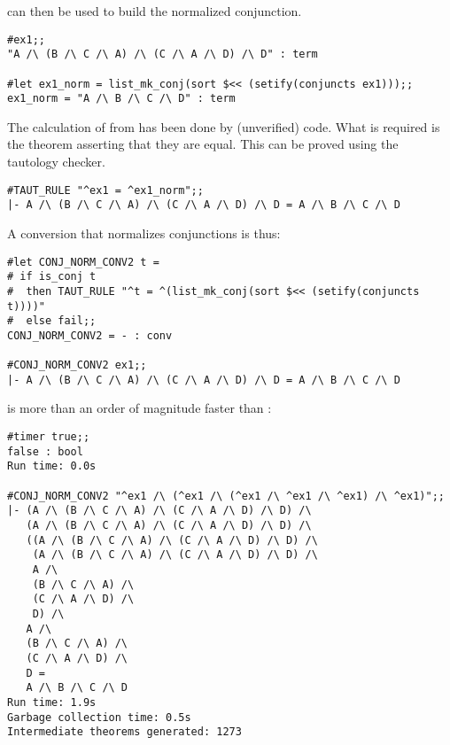 \noindent can then be used to build the normalized conjunction.


\begin{session}\begin{verbatim}
#ex1;;
"A /\ (B /\ C /\ A) /\ (C /\ A /\ D) /\ D" : term

#let ex1_norm = list_mk_conj(sort $<< (setify(conjuncts ex1)));;
ex1_norm = "A /\ B /\ C /\ D" : term
\end{verbatim}\end{session}

\noindent The calculation of  from  has been
done by (unverified) \ML{} code. What is required is the theorem
asserting that they are equal. This can be proved using the tautology
checker.

\begin{session}\begin{verbatim}
#TAUT_RULE "^ex1 = ^ex1_norm";;
|- A /\ (B /\ C /\ A) /\ (C /\ A /\ D) /\ D = A /\ B /\ C /\ D
\end{verbatim}\end{session}

\noindent A conversion that normalizes conjunctions is thus:

\begin{session}\begin{verbatim}
#let CONJ_NORM_CONV2 t =
# if is_conj t
#  then TAUT_RULE "^t = ^(list_mk_conj(sort $<< (setify(conjuncts t))))"
#  else fail;;
CONJ_NORM_CONV2 = - : conv

#CONJ_NORM_CONV2 ex1;;
|- A /\ (B /\ C /\ A) /\ (C /\ A /\ D) /\ D = A /\ B /\ C /\ D
\end{verbatim}\end{session}

\noindent {} is more than an order of magnitude faster
than :


\begin{session}\begin{verbatim}
#timer true;;
false : bool
Run time: 0.0s

#CONJ_NORM_CONV2 "^ex1 /\ (^ex1 /\ (^ex1 /\ ^ex1 /\ ^ex1) /\ ^ex1)";;
|- (A /\ (B /\ C /\ A) /\ (C /\ A /\ D) /\ D) /\
   (A /\ (B /\ C /\ A) /\ (C /\ A /\ D) /\ D) /\
   ((A /\ (B /\ C /\ A) /\ (C /\ A /\ D) /\ D) /\
    (A /\ (B /\ C /\ A) /\ (C /\ A /\ D) /\ D) /\
    A /\
    (B /\ C /\ A) /\
    (C /\ A /\ D) /\
    D) /\
   A /\
   (B /\ C /\ A) /\
   (C /\ A /\ D) /\
   D =
   A /\ B /\ C /\ D
Run time: 1.9s
Garbage collection time: 0.5s
Intermediate theorems generated: 1273
\end{verbatim}\end{session}

